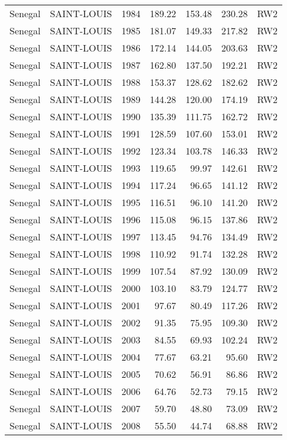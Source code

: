 \begin{longtable}{lllrrrl}
  Senegal & SAINT-LOUIS & 1984 & 189.22 & 153.48 & 230.28 & RW2 \\ 
  Senegal & SAINT-LOUIS & 1985 & 181.07 & 149.33 & 217.82 & RW2 \\ 
  Senegal & SAINT-LOUIS & 1986 & 172.14 & 144.05 & 203.63 & RW2 \\ 
  Senegal & SAINT-LOUIS & 1987 & 162.80 & 137.50 & 192.21 & RW2 \\ 
  Senegal & SAINT-LOUIS & 1988 & 153.37 & 128.62 & 182.62 & RW2 \\ 
  Senegal & SAINT-LOUIS & 1989 & 144.28 & 120.00 & 174.19 & RW2 \\ 
  Senegal & SAINT-LOUIS & 1990 & 135.39 & 111.75 & 162.72 & RW2 \\ 
  Senegal & SAINT-LOUIS & 1991 & 128.59 & 107.60 & 153.01 & RW2 \\ 
  Senegal & SAINT-LOUIS & 1992 & 123.34 & 103.78 & 146.33 & RW2 \\ 
  Senegal & SAINT-LOUIS & 1993 & 119.65 & 99.97 & 142.61 & RW2 \\ 
  Senegal & SAINT-LOUIS & 1994 & 117.24 & 96.65 & 141.12 & RW2 \\ 
  Senegal & SAINT-LOUIS & 1995 & 116.51 & 96.10 & 141.20 & RW2 \\ 
  Senegal & SAINT-LOUIS & 1996 & 115.08 & 96.15 & 137.86 & RW2 \\ 
  Senegal & SAINT-LOUIS & 1997 & 113.45 & 94.76 & 134.49 & RW2 \\ 
  Senegal & SAINT-LOUIS & 1998 & 110.92 & 91.74 & 132.28 & RW2 \\ 
  Senegal & SAINT-LOUIS & 1999 & 107.54 & 87.92 & 130.09 & RW2 \\ 
  Senegal & SAINT-LOUIS & 2000 & 103.10 & 83.79 & 124.77 & RW2 \\ 
  Senegal & SAINT-LOUIS & 2001 & 97.67 & 80.49 & 117.26 & RW2 \\ 
  Senegal & SAINT-LOUIS & 2002 & 91.35 & 75.95 & 109.30 & RW2 \\ 
  Senegal & SAINT-LOUIS & 2003 & 84.55 & 69.93 & 102.24 & RW2 \\ 
  Senegal & SAINT-LOUIS & 2004 & 77.67 & 63.21 & 95.60 & RW2 \\ 
  Senegal & SAINT-LOUIS & 2005 & 70.62 & 56.91 & 86.86 & RW2 \\ 
  Senegal & SAINT-LOUIS & 2006 & 64.76 & 52.73 & 79.15 & RW2 \\ 
  Senegal & SAINT-LOUIS & 2007 & 59.70 & 48.80 & 73.09 & RW2 \\ 
  Senegal & SAINT-LOUIS & 2008 & 55.50 & 44.74 & 68.88 & RW2 \\ 

\end{longtable}
